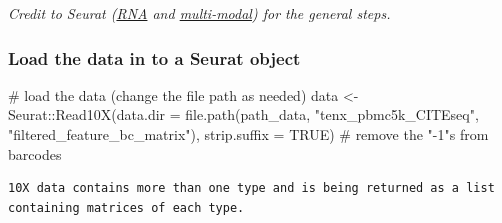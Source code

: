 \documentclass[
  letterpaper,
  DIV=11,
  numbers=noendperiod]{scrartcl}
\newenvironment{Shaded}{\begin{snugshade}}{\end{snugshade}}
\newcommand{\AttributeTok}[1]{\textcolor[rgb]{0.40,0.45,0.13}{#1}}
\newcommand{\CommentTok}[1]{\textcolor[rgb]{0.37,0.37,0.37}{#1}}
\newcommand{\ConstantTok}[1]{\textcolor[rgb]{0.56,0.35,0.01}{#1}}
\newcommand{\DocumentationTok}[1]{\textcolor[rgb]{0.37,0.37,0.37}{\textit{#1}}}
\newcommand{\FunctionTok}[1]{\textcolor[rgb]{0.28,0.35,0.67}{#1}}
\newcommand{\NormalTok}[1]{\textcolor[rgb]{0.00,0.23,0.31}{#1}}
\newcommand{\OtherTok}[1]{\textcolor[rgb]{0.00,0.23,0.31}{#1}}
\newcommand{\SpecialCharTok}[1]{\textcolor[rgb]{0.37,0.37,0.37}{#1}}
\newcommand{\StringTok}[1]{\textcolor[rgb]{0.13,0.47,0.30}{#1}}
\begin{document}
\emph{Credit to Seurat
(\href{https://satijalab.org/seurat/articles/pbmc3k_tutorial.html}{RNA}
and
\href{https://satijalab.org/seurat/articles/multimodal_vignette.html\#setup-a-seurat-object-add-the-rna-and-protein-data}{multi-modal})
for the general steps.}

\hypertarget{load-the-data-in-to-a-seurat-object}{%
\subsubsection{Load the data in to a Seurat
object}\label{load-the-data-in-to-a-seurat-object}}

\begin{Shaded}
\begin{Highlighting}[]
\CommentTok{\# load the data (change the file path as needed)}
\NormalTok{data }\OtherTok{\textless{}{-}}\NormalTok{ Seurat}\SpecialCharTok{::}\FunctionTok{Read10X}\NormalTok{(}\AttributeTok{data.dir =} \FunctionTok{file.path}\NormalTok{(path\_data, }\StringTok{"tenx\_pbmc5k\_CITEseq"}\NormalTok{,                                        }\StringTok{"filtered\_feature\_bc\_matrix"}\NormalTok{),}
                        \AttributeTok{strip.suffix =} \ConstantTok{TRUE}\NormalTok{) }\CommentTok{\# remove the "{-}1"s from barcodes}
\end{Highlighting}
\end{Shaded}

\begin{verbatim}
10X data contains more than one type and is being returned as a list containing matrices of each type.
\end{verbatim}

\begin{Shaded}
\end{Shaded}
\end{document}
